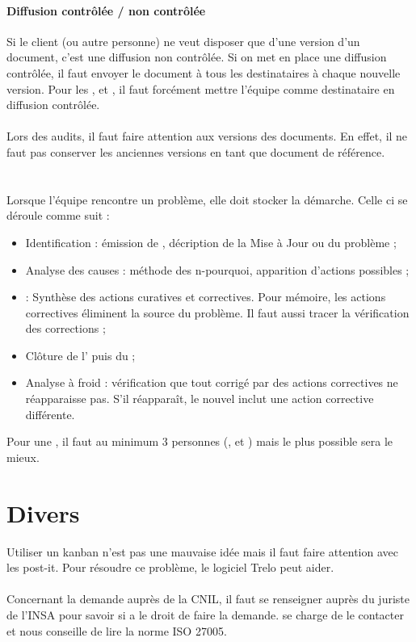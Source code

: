 \documentclass [a4paper] {article}
\begin{document}
\paragraph*{Diffusion contrôlée / non contrôlée}
Si le client (ou autre personne) ne veut disposer que d'une version d'un document, c'est une diffusion non contrôlée. Si on met en place une diffusion contrôlée, il faut envoyer le document à tous les destinataires à chaque nouvelle version. Pour les \DSE{}, \DSI{} et \PQ{}, il faut forcément mettre l'équipe comme destinataire en diffusion contrôlée.

\paragraph*{}
Lors des audits, il faut faire attention aux versions des documents. En effet, il ne faut pas conserver les anciennes versions en tant que document de référence.


\section{\FT}
Lorsque l'équipe rencontre un problème, elle doit stocker la démarche.  Celle ci se déroule comme suit :

\begin{itemize}
\item Identification : émission de \FFT{}, décription de la Mise à Jour ou du problème ;
\item Analyse des causes : méthode des n-pourquoi, apparition d'actions possibles ;
\item \OC : Synthèse des actions curatives et correctives. Pour mémoire, les actions correctives éliminent la source du problème. Il faut aussi tracer la vérification des corrections ;
\item Clôture de l'\OC{} puis du \FT{} ;
\item Analyse à froid : vérification que tout \FT{} corrigé par des actions correctives ne réapparaisse pas. S'il réapparaît, le nouvel \OC{} inclut une action corrective différente.
\end{itemize}

Pour une \CTFT{}, il faut au minimum 3 personnes (\CP{}, \RQ{} et \RGC{}) mais le plus possible sera le mieux.


\section{Divers}

Utiliser un kanban n'est pas une mauvaise idée mais il faut faire attention avec les post-it. Pour résoudre ce problème, le logiciel Trelo peut aider.

\paragraph*{}
Concernant la demande auprès de la CNIL, il faut se renseigner auprès du juriste de l'INSA pour savoir si \Sergi a le droit de faire la demande. \nomTuteurQualite se charge de le contacter et nous conseille de lire la norme ISO 27005.
\end{document}
